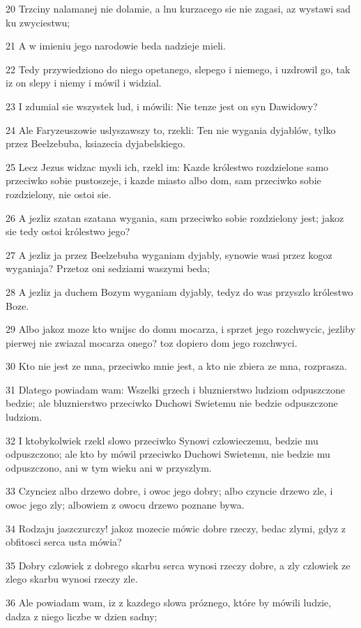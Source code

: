 \par 20 Trzciny nalamanej nie dolamie, a lnu kurzacego sie nie zagasi, az wystawi sad ku zwyciestwu;
\par 21 A w imieniu jego narodowie beda nadzieje mieli.
\par 22 Tedy przywiedziono do niego opetanego, slepego i niemego, i uzdrowil go, tak iz on slepy i niemy i mówil i widzial.
\par 23 I zdumial sie wszystek lud, i mówili: Nie tenze jest on syn Dawidowy?
\par 24 Ale Faryzeuszowie uslyszawszy to, rzekli: Ten nie wygania dyjablów, tylko przez Beelzebuba, ksiazecia dyjabelskiego.
\par 25 Lecz Jezus widzac mysli ich, rzekl im: Kazde królestwo rozdzielone samo przeciwko sobie pustoszeje, i kazde miasto albo dom, sam przeciwko sobie rozdzielony, nie ostoi sie.
\par 26 A jezliz szatan szatana wygania, sam przeciwko sobie rozdzielony jest; jakoz sie tedy ostoi królestwo jego?
\par 27 A jezliz ja przez Beelzebuba wyganiam dyjably, synowie wasi przez kogoz wyganiaja? Przetoz oni sedziami waszymi beda;
\par 28 A jezliz ja duchem Bozym wyganiam dyjably, tedyz do was przyszlo królestwo Boze.
\par 29 Albo jakoz moze kto wnijsc do domu mocarza, i sprzet jego rozchwycic, jezliby pierwej nie zwiazal mocarza onego? toz dopiero dom jego rozchwyci.
\par 30 Kto nie jest ze mna, przeciwko mnie jest, a kto nie zbiera ze mna, rozprasza.
\par 31 Dlatego powiadam wam: Wszelki grzech i bluznierstwo ludziom odpuszczone bedzie; ale bluznierstwo przeciwko Duchowi Swietemu nie bedzie odpuszczone ludziom.
\par 32 I ktobykolwiek rzekl slowo przeciwko Synowi czlowieczemu, bedzie mu odpuszczono; ale kto by mówil przeciwko Duchowi Swietemu, nie bedzie mu odpuszczono, ani w tym wieku ani w przyszlym.
\par 33 Czynciez albo drzewo dobre, i owoc jego dobry; albo czyncie drzewo zle, i owoc jego zly; albowiem z owocu drzewo poznane bywa.
\par 34 Rodzaju jaszczurczy! jakoz mozecie mówic dobre rzeczy, bedac zlymi, gdyz z obfitosci serca usta mówia?
\par 35 Dobry czlowiek z dobrego skarbu serca wynosi rzeczy dobre, a zly czlowiek ze zlego skarbu wynosi rzeczy zle.
\par 36 Ale powiadam wam, iz z kazdego slowa próznego, które by mówili ludzie, dadza z niego liczbe w dzien sadny;
